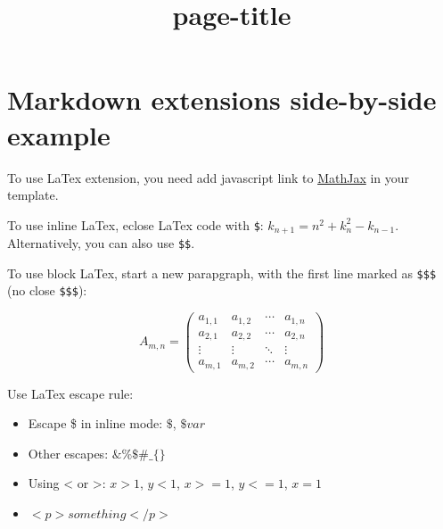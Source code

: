 \documentclass{article}
\title{{page-title}}
\date{}
\begin{document}
\maketitle

\section*{Markdown extensions side-by-side example}



To use LaTex extension, you need add javascript
link to \href{http://www.mathjax.org/}{MathJax} in
your template.


To use inline LaTex, eclose LaTex code with \texttt{\$}:
$k_{n+1} = n^2 + k_n^2 - k_{n-1}$. Alternatively,
you can also use \texttt{\$\$}.


To use block LaTex, start a new parapgraph, with
the first line marked as \texttt{\$\$\$} (no close \texttt{\$\$\$}):


\begin{equation}
A_{m,n} =
 \begin{pmatrix}
  a_{1,1} & a_{1,2} & \cdots & a_{1,n} \\
  a_{2,1} & a_{2,2} & \cdots & a_{2,n} \\
  \vdots  & \vdots  & \ddots & \vdots  \\
  a_{m,1} & a_{m,2} & \cdots & a_{m,n}
 \end{pmatrix}
\end{equation}




Use LaTex escape rule:
\begin{itemize}
\item Escape \$ in inline mode: $\$$, $\$var$

\item Other escapes: $\& \% \$ \# \_ \{ \}$

\item Using < or >: $x > 1$, $y < 1$, $x >= 1$,
$y <= 1$, $x = 1$

\item $<p>something</p>$

\end{itemize}
\end{document}
